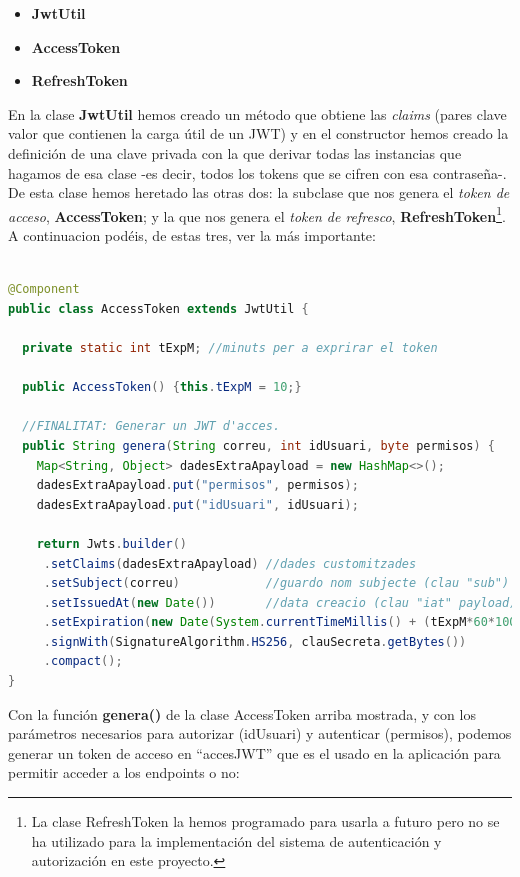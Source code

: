\documentclass[a4paper,12pt]{report}
\begin{document}
		\begin{itemize}
			\setlength{\itemsep}{-.4em}
			\item \textbf{JwtUtil}
			\item \textbf{AccessToken}
			\item \textbf{RefreshToken}
		\end{itemize}
		  
		
		En la clase \textbf{JwtUtil} hemos creado un método que obtiene las \textit{claims} (pares clave valor que contienen la carga útil de un JWT) y en el constructor hemos creado la definición de una clave privada con la que derivar todas las instancias que hagamos de esa clase -es decir, todos los tokens que se cifren con esa contraseña-. De esta clase hemos heretado las otras dos: la subclase que nos genera el \textit{token de acceso}, \textbf{AccessToken}; y la que nos genera el \textit{token de refresco}, \textbf{RefreshToken}\footnote{La clase RefreshToken la hemos programado para usarla a futuro pero no se ha utilizado para la implementación del sistema de autenticación y autorización en este proyecto.}. A continuacion podéis, de estas tres, ver la más importante: 
		
		

		
\begin{lstlisting}[language=Java, basicstyle=\ttfamily\footnotesize, keywordstyle=\color{magenta}]
				
@Component
public class AccessToken extends JwtUtil {
	
  private static int tExpM; //minuts per a exprirar el token
	
  public AccessToken() {this.tExpM = 10;}
	
  //FINALITAT: Generar un JWT d'acces.
  public String genera(String correu, int idUsuari, byte permisos) {
	Map<String, Object> dadesExtraApayload = new HashMap<>();
	dadesExtraApayload.put("permisos", permisos);
	dadesExtraApayload.put("idUsuari", idUsuari);
		
	return Jwts.builder()
	 .setClaims(dadesExtraApayload) //dades customitzades
	 .setSubject(correu)            //guardo nom subjecte (clau "sub")
	 .setIssuedAt(new Date())       //data creacio (clau "iat" payload)
	 .setExpiration(new Date(System.currentTimeMillis() + (tExpM*60*1000)))
	 .signWith(SignatureAlgorithm.HS256, clauSecreta.getBytes())
	 .compact();
}


\end{lstlisting}
		
		
		
		Con la función \textbf{genera()} de la clase AccessToken arriba mostrada, y con los parámetros necesarios para autorizar (idUsuari) y autenticar (permisos), podemos generar un token de acceso en ``accesJWT'' que es el usado en la aplicación para permitir acceder a los endpoints o no:
		
\end{document}
